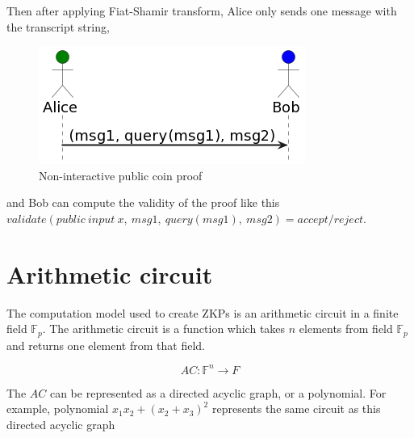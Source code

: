 Then after applying Fiat-Shamir transform, Alice only sends one message with
the transcript string,
\begin{figure}[h]
    \centering
    \includegraphics[scale=0.6]{assets/images/non_interactive_coin.png}
    \caption{Non-interactive public coin proof}
    \label{fig:non_interactive_coin}
    \vspace{0.5cm}
\end{figure}
and Bob can compute the validity of the proof like this
$validate(public\:input\:x,\:msg1,\:query(msg1),\:msg2) = accept/reject$.

\section{Arithmetic circuit}

The computation model used to create ZKPs is an arithmetic circuit in a
finite field $\mathbb{F}_p$. The arithmetic circuit is a function which takes
$n$ elements from field $\mathbb{F}_p$ and returns one element from that field.

\[AC: \mathbb{F}^n \rightarrow F \]

The $AC$ can be represented as a directed acyclic graph, or a polynomial. For
example, polynomial $x_1x_2 + (x_2 + x_3)^2$ represents the same circuit as this
directed acyclic graph

